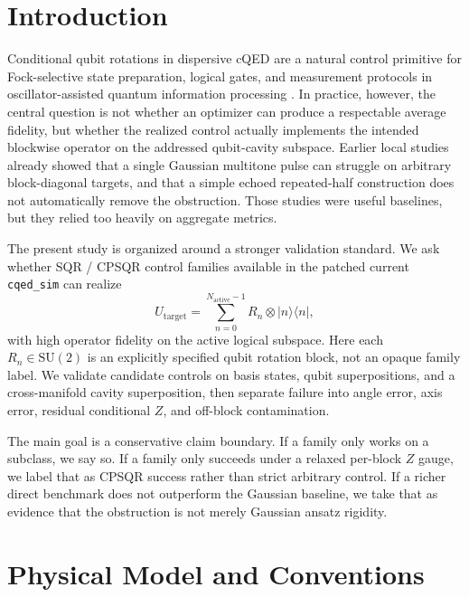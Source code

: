 \documentclass[aps,pra,twocolumn,reprint,floatfix,amsmath,amssymb]{revtex4-2}
\begin{document}
\section{Introduction}
Conditional qubit rotations in dispersive cQED are a natural control primitive for Fock-selective state preparation, logical gates, and measurement protocols in oscillator-assisted quantum information processing \cite{blais2021cqed,koch2007transmon}.  In practice, however, the central question is not whether an optimizer can produce a respectable average fidelity, but whether the realized control actually implements the intended blockwise operator on the addressed qubit-cavity subspace.  Earlier local studies already showed that a single Gaussian multitone pulse can struggle on arbitrary block-diagonal targets, and that a simple echoed repeated-half construction does not automatically remove the obstruction.  Those studies were useful baselines, but they relied too heavily on aggregate metrics.

The present study is organized around a stronger validation standard.  We ask whether SQR / CPSQR control families available in the patched current \texttt{cqed\_sim} can realize
\begin{equation}
U_{\mathrm{target}}
=
\sum_{n=0}^{N_{\mathrm{active}}-1} R_n \otimes |n\rangle\langle n|,
\label{eq:target}
\end{equation}
with high operator fidelity on the active logical subspace.  Here each $R_n \in \mathrm{SU}(2)$ is an explicitly specified qubit rotation block, not an opaque family label.  We validate candidate controls on basis states, qubit superpositions, and a cross-manifold cavity superposition, then separate failure into angle error, axis error, residual conditional $Z$, and off-block contamination.

The main goal is a conservative claim boundary.  If a family only works on a subclass, we say so.  If a family only succeeds under a relaxed per-block $Z$ gauge, we label that as CPSQR success rather than strict arbitrary control.  If a richer direct benchmark does not outperform the Gaussian baseline, we take that as evidence that the obstruction is not merely Gaussian ansatz rigidity.

\section{Physical Model and Conventions}
\end{document}
